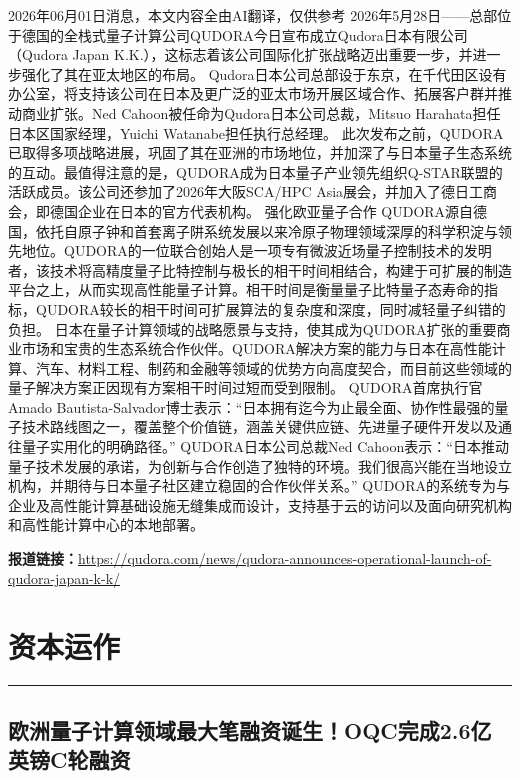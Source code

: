 \documentclass[12pt,a4paper]{ctexart}
\begin{document}
2026年06月01日消息，本文内容全由AI翻译，仅供参考
2026年5月28日——总部位于德国的全栈式量子计算公司QUDORA今日宣布成立Qudora日本有限公司（Qudora Japan K.K.），这标志着该公司国际化扩张战略迈出重要一步，并进一步强化了其在亚太地区的布局。
Qudora日本公司总部设于东京，在千代田区设有办公室，将支持该公司在日本及更广泛的亚太市场开展区域合作、拓展客户群并推动商业扩张。Ned Cahoon被任命为Qudora日本公司总裁，Mitsuo Harahata担任日本区国家经理，Yuichi Watanabe担任执行总经理。
此次发布之前，QUDORA已取得多项战略进展，巩固了其在亚洲的市场地位，并加深了与日本量子生态系统的互动。最值得注意的是，QUDORA成为日本量子产业领先组织Q-STAR联盟的活跃成员。该公司还参加了2026年大阪SCA/HPC Asia展会，并加入了德日工商会，即德国企业在日本的官方代表机构。
强化欧亚量子合作
QUDORA源自德国，依托自原子钟和首套离子阱系统发展以来冷原子物理领域深厚的科学积淀与领先地位。QUDORA的一位联合创始人是一项专有微波近场量子控制技术的发明者，该技术将高精度量子比特控制与极长的相干时间相结合，构建于可扩展的制造平台之上，从而实现高性能量子计算。相干时间是衡量量子比特量子态寿命的指标，QUDORA较长的相干时间可扩展算法的复杂度和深度，同时减轻量子纠错的负担。
日本在量子计算领域的战略愿景与支持，使其成为QUDORA扩张的重要商业市场和宝贵的生态系统合作伙伴。QUDORA解决方案的能力与日本在高性能计算、汽车、材料工程、制药和金融等领域的优势方向高度契合，而目前这些领域的量子解决方案正因现有方案相干时间过短而受到限制。
QUDORA首席执行官Amado Bautista-Salvador博士表示：“日本拥有迄今为止最全面、协作性最强的量子技术路线图之一，覆盖整个价值链，涵盖关键供应链、先进量子硬件开发以及通往量子实用化的明确路径。”
QUDORA日本公司总裁Ned Cahoon表示：“日本推动量子技术发展的承诺，为创新与合作创造了独特的环境。我们很高兴能在当地设立机构，并期待与日本量子社区建立稳固的合作伙伴关系。”
QUDORA的系统专为与企业及高性能计算基础设施无缝集成而设计，支持基于云的访问以及面向研究机构和高性能计算中心的本地部署。

\noindent\textbf{报道链接：}\url{https://qudora.com/news/qudora-announces-operational-launch-of-qudora-japan-k-k/}


\newpage
\section{资本运作}
\vspace{-0.5em}
\noindent\rule{\linewidth}{1.5pt}

\subsection{ 欧洲量子计算领域最大笔融资诞生！OQC完成2.6亿英镑C轮融资 }
\end{document}
